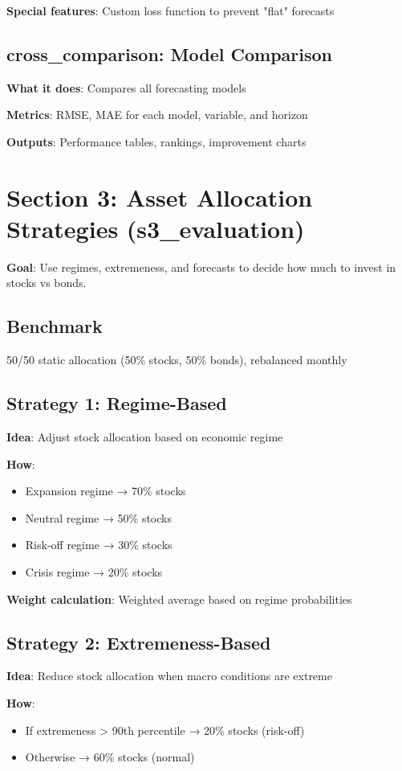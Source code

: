 \documentclass[11pt,a4paper]{article}
\begin{document}
\textbf{Special features}: Custom loss function to prevent "flat" forecasts

\subsection{cross\_comparison: Model Comparison}
\textbf{What it does}: Compares all forecasting models

\textbf{Metrics}: RMSE, MAE for each model, variable, and horizon

\textbf{Outputs}: Performance tables, rankings, improvement charts

\section{Section 3: Asset Allocation Strategies (s3\_evaluation)}

\textbf{Goal}: Use regimes, extremeness, and forecasts to decide how much to invest in stocks vs bonds.

\subsection{Benchmark}
50/50 static allocation (50\% stocks, 50\% bonds), rebalanced monthly

\subsection{Strategy 1: Regime-Based}
\textbf{Idea}: Adjust stock allocation based on economic regime

\textbf{How}: 
\begin{itemize}
    \item Expansion regime → 70\% stocks
    \item Neutral regime → 50\% stocks  
    \item Risk-off regime → 30\% stocks
    \item Crisis regime → 20\% stocks
\end{itemize}

\textbf{Weight calculation}: Weighted average based on regime probabilities

\subsection{Strategy 2: Extremeness-Based}
\textbf{Idea}: Reduce stock allocation when macro conditions are extreme

\textbf{How}:
\begin{itemize}
    \item If extremeness > 90th percentile → 20\% stocks (risk-off)
    \item Otherwise → 60\% stocks (normal)
\end{itemize}
\end{document}
